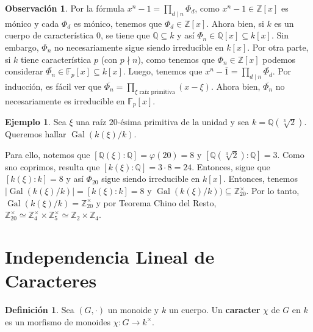 \documentclass[12pt]{book}
\theoremstyle{definition}
\newtheorem{obs}[teo]{Observación}
\newtheorem{defn}[teo]{Definición}
\newtheorem{ex}[teo]{Ejemplo}
\newcommand{\ZZ}{\mathbb{Z}}      %
\newcommand{\QQ}{\mathbb{Q}}
\newcommand{\FF}{\mathbb{F}}
\DeclareMathOperator{\Gal}{Gal}
\begin{document}
\begin{obs}
Por la fórmula $x^n - 1 = \displaystyle\prod_{d\mid n}\Phi_d$, como $x^n - 1 \in\ZZ[x]$ es mónico y cada $\Phi_d$ es mónico, tenemos que $\Phi_d\in\ZZ[x]$. Ahora bien, si $k$ es un cuerpo de característica $0$, se tiene que $\QQ\subseteq k$ y así $\Phi_n\in\QQ[x]\subseteq k[x]$. Sin embargo, $\Phi_n$ no necesariamente sigue siendo irreducible en $k[x]$. Por otra parte, si $k$ tiene característica $p$ (con $p\nmid n$), como tenemos que $\Phi_n\in\ZZ[x]$ podemos considerar $\overline{\Phi_n}\in\FF_p[x]\subseteq k[x]$. Luego, tenemos que $x^n - \overline{1} = \displaystyle\prod_{d\mid n}\overline{\Phi_d}$. Por inducción, es fácil ver que $\overline{\Phi_n} = \displaystyle\prod_{\xi \text{ raíz primitiva}} (x-\xi)$. Ahora bien, $\overline{\Phi_n}$ no necesariamente es irreducible en $\FF_p[x]$.
\end{obs}

\begin{ex}
Sea $\xi$ una raíz $20$-ésima primitiva de la unidad y sea $k=\QQ(\sqrt[3]{2})$. Queremos hallar $\Gal(k(\xi)/k)$.

Para ello, notemos que $[\QQ(\xi):\QQ]=\varphi(20)=8$ y $[\QQ(\sqrt[3]{2}):\QQ]=3$. Como sno coprimos, resulta que $[k(\xi):\QQ]=3\cdot 8 = 24$. Entonces, sigue que $[k(\xi):k]=8$ y así $\Phi_{20}$ sigue siendo irreducible en $k[x]$. Entonces, tenemos $|\Gal(k(\xi)/k)| = [k(\xi):k] = 8$ y $\Gal(k(\xi)/k)) \subseteq \ZZ_{20}^\times$. Por lo tanto, $\Gal(k(\xi)/k)=\ZZ_{20}^\times$ y por Teorema Chino del Resto,  $\ZZ_{20}^\times \simeq \ZZ_4^\times \times \ZZ_5^\times \simeq \ZZ_2\times \ZZ_4$.
\end{ex}

\section{Independencia Lineal de Caracteres}

\begin{defn}
Sea $(G,\cdot)$ un monoide y $k$ un cuerpo. Un \textbf{caracter} $\chi$ de $G$ en $k$ es un morfismo de monoides $\chi:G\to k^\times$.
\end{defn}
\end{document}
